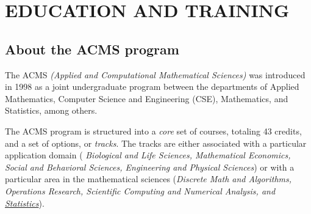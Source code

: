 \section{EDUCATION AND TRAINING}
\label{sec:education}
\subsection{\bf About the ACMS program}

The ACMS {\em (Applied and Computational Mathematical Sciences)} was
introduced in 1998 as a joint undergraduate program between the
departments of Applied Mathematics, Computer Science and Engineering
(CSE), Mathematics, and Statistics, among others.

The ACMS program is structured into a {\em core} set of courses,
totaling 43 credits, and a set of options, or {\em tracks}. The tracks
are either associated with a particular application domain ({\em
  Biological and Life Sciences, Mathematical Economics, Social and
  Behavioral Sciences, Engineering and Physical Sciences}) or with a
particular area in the mathematical sciences ({\em Discrete Math and
  Algorithms, Operations Research, Scientific Computing and Numerical
  Analysis, and \underline{Statistics}}).

